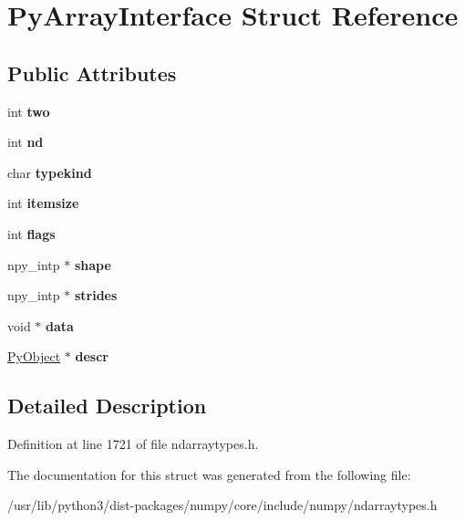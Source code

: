 \hypertarget{structPyArrayInterface}{}\section{Py\+Array\+Interface Struct Reference}
\label{structPyArrayInterface}
\subsection*{Public Attributes}
\begin{DoxyCompactItemize}
\item 
int {\bfseries two}\hypertarget{structPyArrayInterface_ab6d24fbafdbe601ef3c77720ffecb470}{}\label{structPyArrayInterface_ab6d24fbafdbe601ef3c77720ffecb470}

\item 
int {\bfseries nd}\hypertarget{structPyArrayInterface_a7d5208cc0c4f5bcaaeff6e1bf02e35e3}{}\label{structPyArrayInterface_a7d5208cc0c4f5bcaaeff6e1bf02e35e3}

\item 
char {\bfseries typekind}\hypertarget{structPyArrayInterface_aae32b9e36b1b8fead0c2f69f2c5b899f}{}\label{structPyArrayInterface_aae32b9e36b1b8fead0c2f69f2c5b899f}

\item 
int {\bfseries itemsize}\hypertarget{structPyArrayInterface_a175d53ca477bddfa28d6d0651bdb1a67}{}\label{structPyArrayInterface_a175d53ca477bddfa28d6d0651bdb1a67}

\item 
int {\bfseries flags}\hypertarget{structPyArrayInterface_ae4f40681a287c2abd1b36e9a660a1ad3}{}\label{structPyArrayInterface_ae4f40681a287c2abd1b36e9a660a1ad3}

\item 
npy\+\_\+intp $\ast$ {\bfseries shape}\hypertarget{structPyArrayInterface_a2f17bc1d9781079c82882d65bb7c9554}{}\label{structPyArrayInterface_a2f17bc1d9781079c82882d65bb7c9554}

\item 
npy\+\_\+intp $\ast$ {\bfseries strides}\hypertarget{structPyArrayInterface_aaeae870e2df7138644287ba56ed4f4c5}{}\label{structPyArrayInterface_aaeae870e2df7138644287ba56ed4f4c5}

\item 
void $\ast$ {\bfseries data}\hypertarget{structPyArrayInterface_a0c0636afa74f47d77bfd2e6d904a3ea2}{}\label{structPyArrayInterface_a0c0636afa74f47d77bfd2e6d904a3ea2}

\item 
\hyperlink{struct__object}{Py\+Object} $\ast$ {\bfseries descr}\hypertarget{structPyArrayInterface_a0bedb124369090961534be9b6fb3f410}{}\label{structPyArrayInterface_a0bedb124369090961534be9b6fb3f410}

\end{DoxyCompactItemize}


\subsection{Detailed Description}


Definition at line 1721 of file ndarraytypes.\+h.



The documentation for this struct was generated from the following file\+:\begin{DoxyCompactItemize}
\item 
/usr/lib/python3/dist-\/packages/numpy/core/include/numpy/ndarraytypes.\+h\end{DoxyCompactItemize}
